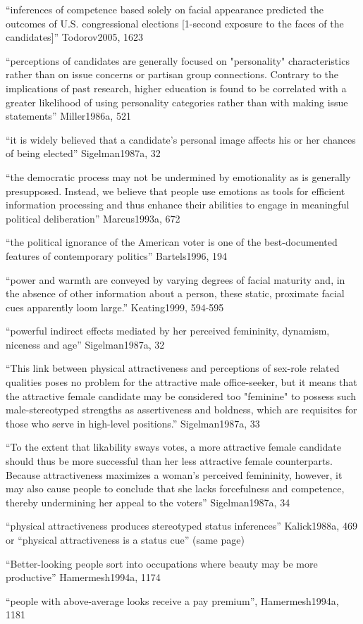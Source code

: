 ``inferences of competence based solely on facial appearance predicted the outcomes of U.S. congressional elections [1-second exposure to the faces of the candidates]'' Todorov2005, 1623

``perceptions of candidates are generally focused on "personality" characteristics rather than on issue concerns or partisan group connections. Contrary to the implications of past research, higher education is found to be correlated with a greater likelihood of using personality categories rather than with making issue statements'' Miller1986a, 521

``it is widely believed that a candidate's personal image affects his or her chances of being elected'' Sigelman1987a, 32

``the democratic process may not be undermined by emotionality as is generally presupposed. Instead, we believe that people use emotions as tools for efficient information processing and thus enhance their abilities to engage in meaningful political deliberation'' Marcus1993a, 672

``the political ignorance of the American voter is one of the best-documented features of contemporary politics'' Bartels1996, 194

``power and warmth are conveyed by varying degrees of facial maturity and, in the absence of other information about a person, these static, proximate facial cues apparently loom large.'' Keating1999, 594-595



``powerful indirect effects mediated by her perceived femininity, dynamism, niceness and age'' Sigelman1987a, 32

``This link between physical attractiveness and perceptions of sex-role related qualities poses no problem for the attractive male office-seeker, but it means that the attractive female candidate may be considered too "feminine" to possess such male-stereotyped strengths as assertiveness and boldness, which are requisites for those who serve in high-level positions.''  Sigelman1987a, 33

``To the extent that likability sways votes, a more attractive female candidate should thus be more successful than her less attractive female counterparts. Because attractiveness maximizes a woman's perceived femininity, however, it may also cause people to conclude that she lacks forcefulness and competence, thereby undermining her appeal to the voters''  Sigelman1987a, 34


``physical attractiveness produces stereotyped status inferences'' Kalick1988a, 469 or ``physical attractiveness is a status cue'' (same page)

``Better-looking people sort into occupations where beauty may be more productive'' Hamermesh1994a, 1174

``people with above-average looks receive a pay premium'', Hamermesh1994a, 1181




